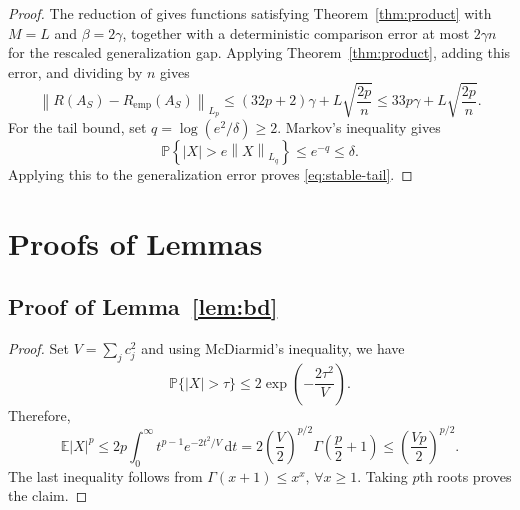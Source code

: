 \documentclass[11pt]{article}
\newcommand{\E}{\mathbb{E}}
\newcommand{\Pp}{\mathbb{P}}
\newcommand{\norm}[1]{\left\lVert #1\right\rVert}
\newcommand{\abs}[1]{\left\lvert #1\right\rvert}
\begin{document}
\begin{proof}
The reduction of \cite[Lemma~7]{bkz2020} gives functions satisfying Theorem~\ref{thm:product} with $M=L$ and $\beta=2\gamma$, together with a deterministic comparison error at most $2\gamma n$ for the rescaled generalization gap. Applying Theorem~\ref{thm:product}, adding this error, and dividing by $n$ gives
\[
\norm{R(A_S)-R_{\mathrm{emp}}(A_S)}_{L_p} \le (32p+2)\gamma + L\sqrt{\frac{2p}{n}} \le 33p\gamma + L\sqrt{\frac{2p}{n}}.
\]
For the tail bound, set $q=\log(e^2/\delta)\ge2$. Markov's inequality gives
\[
\Pp\left\{ \abs{X}>e\norm{X}_{L_q} \right\} \le e^{-q} \le\delta.
\]
Applying this to the generalization error proves \eqref{eq:stable-tail}.
\end{proof}





\newpage
\appendix 
\section{Proofs of Lemmas}

\subsection{Proof of Lemma~\ref{lem:bd}} \label{proof:lem-bd} 
\begin{proof}
Set $V=\sum_jc_j^2$ and using McDiarmid's inequality, we have
\[
\Pp\{\abs X>\tau\} \le 2\exp\left(-\frac{2\tau^2}{V}\right). \]
Therefore, 
\[
\E\abs X^p \le 2p\int_0^\infty t^{p-1}e^{-2t^2/V}\,\mathrm{d}t = 2\left(\frac V2\right)^{p/2}\Gamma\left(\frac p2+1\right) \le \left(\frac{Vp}{2}\right)^{p/2}.
\]
The last inequality follows from $\Gamma(x+1) \le x^x,\, \forall x \ge 1$. Taking $p$th roots proves the claim.
\end{proof} 
\end{document}
